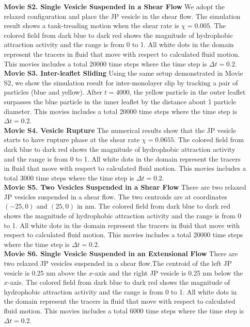 \noindent
{\bf Movie S2. Single Vesicle Suspended in a Shear Flow} 
We adopt the relaxed configuration and place the JP vesicle in the shear flow. The simulation result shows a tank-treading motion when the shear rate is $\chi=0.005$.
The colored field from dark blue to dark red shows the magnitude of hydrophobic attraction activity and the range is from 0 to 1. All white dots in the domain represent the tracers in fluid that move with respect to calculated fluid motion.
This movies includes a total 20000 time steps where the time step is $\Delta t=0.2$.\\

\noindent
{\bf Movie S3. Inter-leaflet Sliding} 
Using the same setup demonstrated in Movie S2, we show the simulation result for 
inter-monolayer slip by tracking a pair of particles (blue and yellow). After $t=4000$, 
the yellow particle in the outer leaflet surpasses the blue particle in the inner leaflet by the distance about 1 particle diameter.
This movies includes a total 20000 time steps where the time step is $\Delta t=0.2$.\\


\noindent
{\bf Movie S4. Vesicle Rupture} 
The numerical results show that the JP vesicle starts to have rupture phase at the shear rate $\chi=0.0655$. The colored field from dark blue to dark red shows the magnitude of hydrophobic attraction activity and the range is from 0 to 1. All white dots in the domain represent the tracers in fluid that move with respect to calculated fluid motion. This movies includes a total 3000 time steps where the time step is $\Delta t=0.2$.\\


\noindent
{\bf Movie S5. Two Vesicles Suspended in a Shear Flow} 
There are two relaxed JP vesicles suspended in a shear flow. The two centroids are at coordinates $(-25,0)$ and $(25,0)$ in nm. The colored field from dark blue to dark red shows the magnitude of hydrophobic attraction activity and the range is from 0 to 1. All white dots in the domain represent the tracers in fluid that move with respect to calculated fluid motion. This movies includes a total 20000 time steps where the time step is $\Delta t=0.2$.\\


\noindent
{\bf Movie S6. Single Vesicle Suspended in an Extensional Flow} 
There are two relaxed JP vesicles suspended in a shear flow.The centroid of the left JP vesicle is 0.25 nm above the $x$-axis and the right JP vesicle is 0.25 nm below the $x$-axis. The colored field from dark blue to dark red shows the magnitude of hydrophobic attraction activity and the range is from 0 to 1. All white dots in the domain represent the tracers in fluid that move with respect to calculated fluid motion.
This movies includes a total 6000 time steps where the time step is $\Delta t=0.2$.\\



